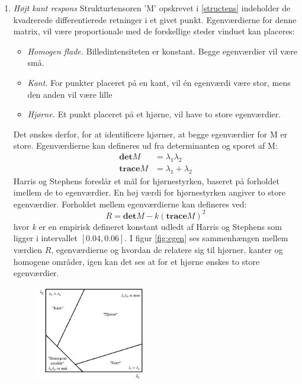 \begin{enumerate}
\item{\textit{Højt kant respons} Strukturtensoren 'M' opskrevet i \eqref{structens} indeholder de kvadrerede differentierede retninger i et givet punkt. Egenværdierne for denne matrix, vil være proportionale med de forskellige steder vinduet kan placeres:
\begin{itemize}
\item{ \textit{Homogen flade.} Billedintensiteten er konstant. Begge egenværdier vil være små.}
\item{\textit{Kant.} For punkter placeret på en kant, vil én egenværdi være stor, mens den anden vil være lille}
\item{\textit{Hjørne.} Et punkt placeret på et hjørne, vil have to store egenværdier.}
\end{itemize}
Det ønskes derfor, for at identificere hjørner, at begge egenværdier for M er store. Egenværdierne kan defineres ud fra determinanten og sporet af M:
\begin{subequations}
\begin{align}
\textbf{det}M & = \lambda_1 \lambda_2 \\
\textbf{trace}M & = \lambda_1+\lambda_2
\end{align}
\end{subequations}
Harris og Stephens foreslår et mål for hjørnestyrken, baseret på forholdet imellem de to egenværdier. En høj værdi for hjørnestyrken angiver to store egenværdier. Forholdet mellem egenværdierne kan defineres ved:
\begin{equation}
R = \textbf{det}M-k(\textbf{trace}M)^2
\label{rvalharris}
\end{equation}
hvor \textit{k} er en empirisk defineret konstant udledt af Harris og Stephens som ligger i intervallet $[0.04,0.06]$. I figur \ref{fig:egen} ses sammenhængen mellem værdien $R$, egenværdierne og hvordan de relatere sig til hjørner, kanter og homogene områder, igen kan det ses at for et hjørne ønskes to store egenværdier.
\begin{figure}[H]
    \centering
    \includegraphics[width=0.45\textwidth]{fig/26.png}

\end{figure}}
\end{enumerate}
